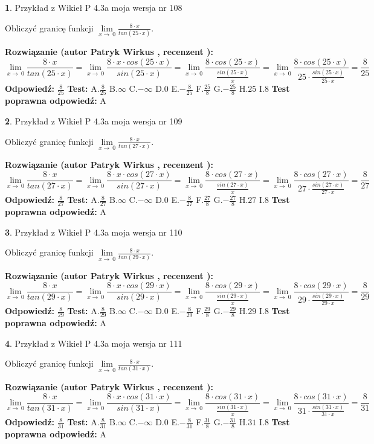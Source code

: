 \documentclass[12pt, a4paper]{article}
\theoremstyle{definition} %
\newtheorem{zad}{}
\newcommand{\zadStart}[1]{\begin{zad}#1\newline}
\newcommand{\zadStop}{\end{zad}}
\newcommand{\rozwStart}[2]{\noindent \textbf{Rozwiązanie (autor #1 , recenzent #2): }\newline}
\newcommand{\rozwStop}{\newline}
\newcommand{\odpStart}{\noindent \textbf{Odpowiedź:}\newline}
\newcommand{\odpStop}{\newline}
\newcommand{\testStart}{\noindent \textbf{Test:}\newline}
\newcommand{\testStop}{\newline}
\newcommand{\kluczStart}{\noindent \textbf{Test poprawna odpowiedź:}\newline}
\newcommand{\kluczStop}{\newline}
\begin{document}
\zadStart{Przykład z Wikieł P 4.3a moja wersja nr 108}


Obliczyć granicę funkcji $\lim\limits_{x\to\ 0}\frac{8 \cdot x}{tan(25 \cdot x)}$.
\zadStop
\rozwStart{Patryk Wirkus}{}
$$\lim\limits_{x\to\ 0}\frac{8 \cdot x}{tan(25 \cdot x)}=\lim\limits_{x\to\ 0}\frac{8 \cdot x \cdot cos(25 \cdot x)}{sin(25 \cdot x)}=\lim\limits_{x\to\ 0}\frac{8 \cdot cos(25 \cdot x)}{\frac{sin(25 \cdot x)}{x}}=\lim\limits_{x\to\ 0}\frac{8 \cdot cos(25 \cdot x)}{25 \cdot \frac{sin(25 \cdot x)}{25 \cdot x}} = \frac{8}{25}$$
\rozwStop
\odpStart
$\frac{8}{25}$
\odpStop
\testStart
A.$\frac{8}{25}$
B.$\infty$
C.$-\infty$
D.$0$
E.$-\frac{8}{25}$
F.$\frac{25}{8}$
G.$-\frac{25}{8}$
H.$25$
I.$8$
\testStop
\kluczStart
A
\kluczStop



\zadStart{Przykład z Wikieł P 4.3a moja wersja nr 109}


Obliczyć granicę funkcji $\lim\limits_{x\to\ 0}\frac{8 \cdot x}{tan(27 \cdot x)}$.
\zadStop
\rozwStart{Patryk Wirkus}{}
$$\lim\limits_{x\to\ 0}\frac{8 \cdot x}{tan(27 \cdot x)}=\lim\limits_{x\to\ 0}\frac{8 \cdot x \cdot cos(27 \cdot x)}{sin(27 \cdot x)}=\lim\limits_{x\to\ 0}\frac{8 \cdot cos(27 \cdot x)}{\frac{sin(27 \cdot x)}{x}}=\lim\limits_{x\to\ 0}\frac{8 \cdot cos(27 \cdot x)}{27 \cdot \frac{sin(27 \cdot x)}{27 \cdot x}} = \frac{8}{27}$$
\rozwStop
\odpStart
$\frac{8}{27}$
\odpStop
\testStart
A.$\frac{8}{27}$
B.$\infty$
C.$-\infty$
D.$0$
E.$-\frac{8}{27}$
F.$\frac{27}{8}$
G.$-\frac{27}{8}$
H.$27$
I.$8$
\testStop
\kluczStart
A
\kluczStop



\zadStart{Przykład z Wikieł P 4.3a moja wersja nr 110}


Obliczyć granicę funkcji $\lim\limits_{x\to\ 0}\frac{8 \cdot x}{tan(29 \cdot x)}$.
\zadStop
\rozwStart{Patryk Wirkus}{}
$$\lim\limits_{x\to\ 0}\frac{8 \cdot x}{tan(29 \cdot x)}=\lim\limits_{x\to\ 0}\frac{8 \cdot x \cdot cos(29 \cdot x)}{sin(29 \cdot x)}=\lim\limits_{x\to\ 0}\frac{8 \cdot cos(29 \cdot x)}{\frac{sin(29 \cdot x)}{x}}=\lim\limits_{x\to\ 0}\frac{8 \cdot cos(29 \cdot x)}{29 \cdot \frac{sin(29 \cdot x)}{29 \cdot x}} = \frac{8}{29}$$
\rozwStop
\odpStart
$\frac{8}{29}$
\odpStop
\testStart
A.$\frac{8}{29}$
B.$\infty$
C.$-\infty$
D.$0$
E.$-\frac{8}{29}$
F.$\frac{29}{8}$
G.$-\frac{29}{8}$
H.$29$
I.$8$
\testStop
\kluczStart
A
\kluczStop



\zadStart{Przykład z Wikieł P 4.3a moja wersja nr 111}


Obliczyć granicę funkcji $\lim\limits_{x\to\ 0}\frac{8 \cdot x}{tan(31 \cdot x)}$.
\zadStop
\rozwStart{Patryk Wirkus}{}
$$\lim\limits_{x\to\ 0}\frac{8 \cdot x}{tan(31 \cdot x)}=\lim\limits_{x\to\ 0}\frac{8 \cdot x \cdot cos(31 \cdot x)}{sin(31 \cdot x)}=\lim\limits_{x\to\ 0}\frac{8 \cdot cos(31 \cdot x)}{\frac{sin(31 \cdot x)}{x}}=\lim\limits_{x\to\ 0}\frac{8 \cdot cos(31 \cdot x)}{31 \cdot \frac{sin(31 \cdot x)}{31 \cdot x}} = \frac{8}{31}$$
\rozwStop
\odpStart
$\frac{8}{31}$
\odpStop
\testStart
A.$\frac{8}{31}$
B.$\infty$
C.$-\infty$
D.$0$
E.$-\frac{8}{31}$
F.$\frac{31}{8}$
G.$-\frac{31}{8}$
H.$31$
I.$8$
\testStop
\kluczStart
A
\kluczStop
\end{document}
